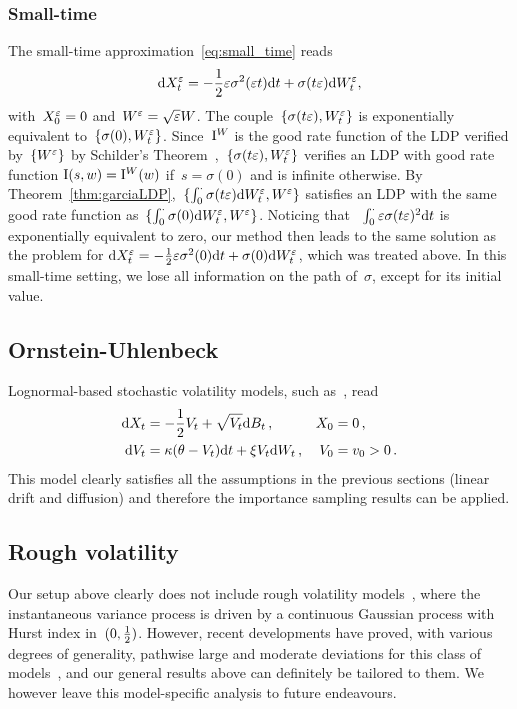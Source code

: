 \subsubsection{Small-time}
The small-time approximation~\eqref{eq:small_time} reads
$$\mathrm{d} X_t^{\varepsilon} = -\frac{1}{2}\varepsilon\sigma^2(\varepsilon t)\mathrm{d} t + \sigma(t\varepsilon) \mathrm{d} W_t^{\varepsilon},$$
with~$X_0 ^{\varepsilon} = 0$ and~$W^{\varepsilon} = \sqrt{\varepsilon}W$.
The couple~$\{\sigma(t\varepsilon), W_t^\varepsilon\}$ is exponentially equivalent to~$\{\sigma(0),W_t^\varepsilon\}$. 
Since~$\mathrm{I}^{W}$ is the good rate function of the LDP verified by~$\{W^\varepsilon\}$ by Schilder's Theorem~\cite[Theorem 5.2.3]{Dembo2010LargeApplications},~$\{\sigma(t\varepsilon), W_t^\varepsilon\}$ verifies an LDP with good rate function
$\mathrm{I}(s,w) = \mathrm{I}^{W}(w)$
if~$s = \sigma(0)$ and is infinite otherwise.
By Theorem~\ref{thm:garciaLDP},~$\{\int_0^\cdot\sigma(t\varepsilon)\mathrm{d} W_t^\varepsilon,W^\varepsilon\}$ satisfies an LDP with the same good rate function as~$\{\int_0^\cdot\sigma(0)\mathrm{d} W_t^\varepsilon,W^\varepsilon\}$. 
Noticing that ~$\int_0^\cdot \varepsilon \sigma(t\varepsilon)^2\mathrm{d} t$ is exponentially equivalent to zero, our method then leads to the same solution as the problem for 
$\mathrm{d} X_t^{\varepsilon} = -\frac{1}{2}\varepsilon\sigma^2(0)\mathrm{d} t + \sigma(0) \mathrm{d} W_t^{\varepsilon}$,
which was treated above. 
In this small-time setting, we lose all information on the path of~$\sigma$, except for its initial value.



\subsection{Ornstein-Uhlenbeck}\label{sec:OU}
Lognormal-based stochastic volatility models, 
such as~\cite{Sepp2012BetaModel}, read
\begin{equation}\label{eq:LogNormalVol}
\begin{aligned}
    \mathrm{d} X_t &= -\frac12 V_t + \sqrt{V_t}\mathrm{d} B_t\,, & X_0 &= 0\,,\\
    \mathrm{d} V_t &= \kappa (\theta - V_t)\mathrm{d} t + \xi V_t\mathrm{d} W_t\,, & V_0 &= v_0 > 0\,.
\end{aligned}
\end{equation}
This model clearly satisfies all the assumptions in the previous sections (linear drift and diffusion)
and therefore the importance sampling results can be applied.

\subsection{Rough volatility}\label{sec:RoughVol}
Our setup above clearly does not include rough volatility models~\cite{Gatheral2018VolatilityRough}, where the instantaneous variance process is driven by a continuous Gaussian process with Hurst index in~$(0,\frac{1}{2})$.
However, recent developments have proved, with various degrees of generality,
pathwise large and moderate deviations for this class of models~\cite{Gerhold2021PathwiseCorrigendum, Gulisashvili2018LargeModels, Gulisashvili2021Time-inhomogeneousRoughness, Jacquier2018PathwiseModel, Jacquier2022LargeSystems},
and our general results above can definitely be tailored to them.
We however leave this model-specific analysis to future endeavours.


